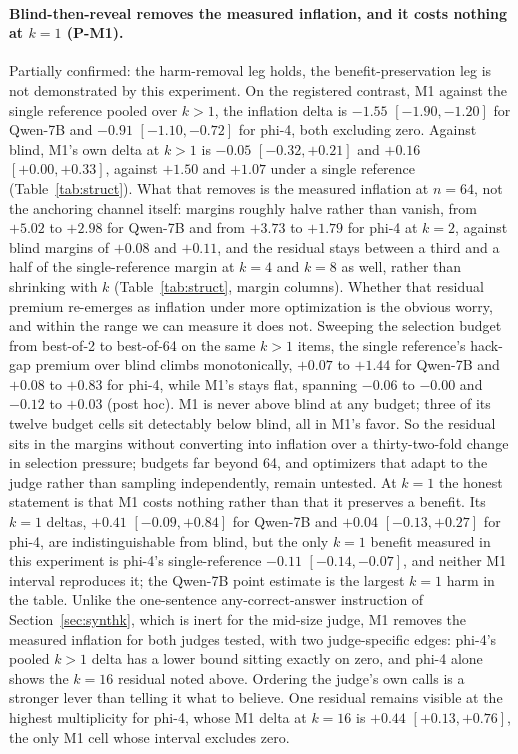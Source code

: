 \documentclass[11pt]{article}
\begin{document}
\paragraph{Blind-then-reveal removes the measured inflation, and it costs nothing at $k{=}1$ (P-M1).}
Partially confirmed: the harm-removal leg holds, the benefit-preservation leg is not demonstrated by this experiment.
On the registered contrast, M1 against the single reference pooled over $k > 1$, the inflation delta is $-1.55$ $[-1.90, -1.20]$ for Qwen-7B and $-0.91$ $[-1.10, -0.72]$ for phi-4, both excluding zero.
Against blind, M1's own delta at $k > 1$ is $-0.05$ $[-0.32, +0.21]$ and $+0.16$ $[+0.00, +0.33]$, against $+1.50$ and $+1.07$ under a single reference (Table~\ref{tab:struct}).
What that removes is the measured inflation at $n{=}64$, not the anchoring channel itself: margins roughly halve rather than vanish, from $+5.02$ to $+2.98$ for Qwen-7B and from $+3.73$ to $+1.79$ for phi-4 at $k{=}2$, against blind margins of $+0.08$ and $+0.11$, and the residual stays between a third and a half of the single-reference margin at $k{=}4$ and $k{=}8$ as well, rather than shrinking with $k$ (Table~\ref{tab:struct}, margin columns).
Whether that residual premium re-emerges as inflation under more optimization is the obvious worry, and within the range we can measure it does not.
Sweeping the selection budget from best-of-2 to best-of-64 on the same $k{>}1$ items, the single reference's hack-gap premium over blind climbs monotonically, $+0.07$ to $+1.44$ for Qwen-7B and $+0.08$ to $+0.83$ for phi-4, while M1's stays flat, spanning $-0.06$ to $-0.00$ and $-0.12$ to $+0.03$ (post hoc).
M1 is never above blind at any budget; three of its twelve budget cells sit detectably below blind, all in M1's favor.
So the residual sits in the margins without converting into inflation over a thirty-two-fold change in selection pressure; budgets far beyond 64, and optimizers that adapt to the judge rather than sampling independently, remain untested.
At $k{=}1$ the honest statement is that M1 costs nothing rather than that it preserves a benefit.
Its $k{=}1$ deltas, $+0.41$ $[-0.09, +0.84]$ for Qwen-7B and $+0.04$ $[-0.13, +0.27]$ for phi-4, are indistinguishable from blind, but the only $k{=}1$ benefit measured in this experiment is phi-4's single-reference $-0.11$ $[-0.14, -0.07]$, and neither M1 interval reproduces it; the Qwen-7B point estimate is the largest $k{=}1$ harm in the table.
Unlike the one-sentence any-correct-answer instruction of Section~\ref{sec:synthk}, which is inert for the mid-size judge, M1 removes the measured inflation for both judges tested, with two judge-specific edges: phi-4's pooled $k{>}1$ delta has a lower bound sitting exactly on zero, and phi-4 alone shows the $k{=}16$ residual noted above.
Ordering the judge's own calls is a stronger lever than telling it what to believe.
One residual remains visible at the highest multiplicity for phi-4, whose M1 delta at $k{=}16$ is $+0.44$ $[+0.13, +0.76]$, the only M1 cell whose interval excludes zero.
\end{document}
